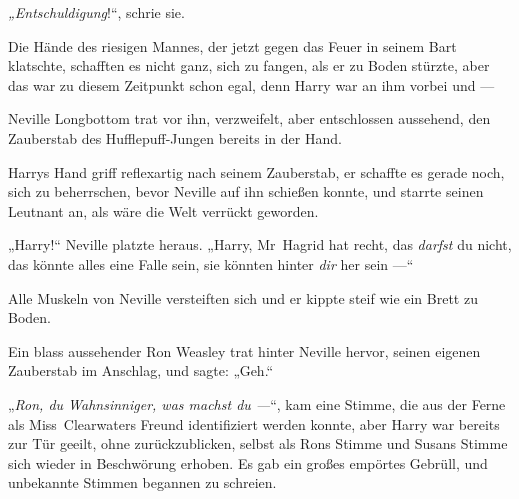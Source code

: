 \emph{„Entschuldigung}!“, schrie sie.  

Die Hände des riesigen Mannes, der jetzt gegen das Feuer in seinem Bart klatschte, schafften es nicht ganz, sich zu fangen, als er zu Boden stürzte, aber das war zu diesem Zeitpunkt schon egal, denn Harry war an ihm vorbei und —

Neville Longbottom trat vor ihn, verzweifelt, aber entschlossen aussehend, den Zauberstab des Hufflepuff-Jungen bereits in der Hand.

Harrys Hand griff reflexartig nach seinem Zauberstab, er schaffte es gerade noch, sich zu beherrschen, bevor Neville auf ihn schießen konnte, und starrte seinen Leutnant an, als wäre die Welt verrückt geworden.

„Harry!“ Neville platzte heraus.
„Harry, Mr~Hagrid hat recht, das \emph{darfst} du nicht, das könnte alles eine Falle sein, sie könnten hinter \emph{dir} her sein —“

Alle Muskeln von Neville versteiften sich und er kippte steif wie ein Brett zu Boden.

Ein blass aussehender Ron Weasley trat hinter Neville hervor, seinen eigenen Zauberstab im Anschlag, und sagte:
„Geh.“

„\emph{Ron, du Wahnsinniger, was machst du —}“, kam eine Stimme, die aus der Ferne als Miss~Clearwaters Freund identifiziert werden konnte, aber Harry war bereits zur Tür geeilt, ohne zurückzublicken, selbst als Rons Stimme und Susans Stimme sich wieder in Beschwörung erhoben. Es gab ein großes empörtes Gebrüll, und unbekannte Stimmen begannen zu schreien.


